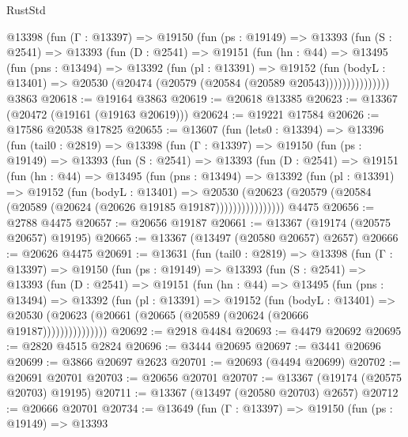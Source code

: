 \begin{lexlean}{RustStd}
\begin{coremodule}
        @13398
          (fun (Γ : @13397) =>
          @19150
            (fun (ps : @19149) =>
            @13393
              (fun (S : @2541) =>
              @13393
                (fun (D : @2541) =>
                @19151
                  (fun (hn : @44) =>
                  @13495
                    (fun (pns : @13494) =>
                    @13392
                      (fun (pl : @13391) =>
                      @19152
                        (fun (bodyL : @13401) =>
                        @20530 (@20474 (@20579 (@20584 (@20589 @20543)))))))))))))))
    @3863
@20618 := @19164 @3863
@20619 := @20618 @13385
@20623 := @13367 (@20472 (@19161 (@19163 @20619)))
@20624 := @19221 @17584
@20626 := @17586 @20538 @17825
@20655 := @13607
    (fun (lets0 : @13394) =>
    @13396
      (fun (tail0 : @2819) =>
      @13398
        (fun (Γ : @13397) =>
        @19150
          (fun (ps : @19149) =>
          @13393
            (fun (S : @2541) =>
            @13393
              (fun (D : @2541) =>
              @19151
                (fun (hn : @44) =>
                @13495
                  (fun (pns : @13494) =>
                  @13392
                    (fun (pl : @13391) =>
                    @19152
                      (fun (bodyL : @13401) =>
                      @20530
                        (@20623
                          (@20579 (@20584 (@20589 (@20624 (@20626 @19185 @19187))))))))))))))))
    @4475
@20656 := @2788 @4475
@20657 := @20656 @19187
@20661 := @13367 (@19174 (@20575 @20657) @19195)
@20665 := @13367 (@13497 (@20580 @20657) @2657)
@20666 := @20626 @4475
@20691 := @13631
    (fun (tail0 : @2819) =>
    @13398
      (fun (Γ : @13397) =>
      @19150
        (fun (ps : @19149) =>
        @13393
          (fun (S : @2541) =>
          @13393
            (fun (D : @2541) =>
            @19151
              (fun (hn : @44) =>
              @13495
                (fun (pns : @13494) =>
                @13392
                  (fun (pl : @13391) =>
                  @19152
                    (fun (bodyL : @13401) =>
                    @20530 (@20623 (@20661 (@20665 (@20589 (@20624 (@20666 @19187)))))))))))))))
@20692 := @2918 @4484
@20693 := @4479 @20692
@20695 := @2820 @4515 @2824
@20696 := @3444 @20695
@20697 := @3441 @20696
@20699 := @3866 @20697 @2623
@20701 := @20693 (@4494 @20699)
@20702 := @20691 @20701
@20703 := @20656 @20701
@20707 := @13367 (@19174 (@20575 @20703) @19195)
@20711 := @13367 (@13497 (@20580 @20703) @2657)
@20712 := @20666 @20701
@20734 := @13649
    (fun (Γ : @13397) =>
    @19150
      (fun (ps : @19149) =>
      @13393

\end{coremodule}
\end{lexlean}
